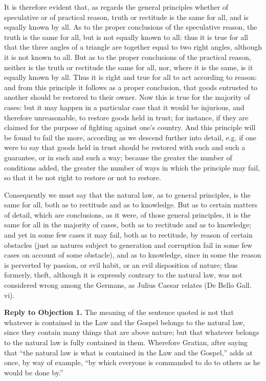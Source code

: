 It is therefore evident that, as regards the general principles whether of speculative or of practical reason, truth or rectitude is the same for all, and is equally known by all. As to the proper conclusions of the speculative reason, the truth is the same for all, but is not equally known to all: thus it is true for all that the three angles of a triangle are together equal to two right angles, although it is not known to all. But as to the proper conclusions of the practical reason, neither is the truth or rectitude the same for all, nor, where it is the same, is it equally known by all. Thus it is right and true for all to act according to reason: and from this principle it follows as a proper conclusion, that goods entrusted to another should be restored to their owner. Now this is true for the majority of cases: but it may happen in a particular case that it would be injurious, and therefore unreasonable, to restore goods held in trust; for instance, if they are claimed for the purpose of fighting against one's country. And this principle will be found to fail the more, according as we descend further into detail, e.g. if one were to say that goods held in trust should be restored with such and such a guarantee, or in such and such a way; because the greater the number of conditions added, the greater the number of ways in which the principle may fail, so that it be not right to restore or not to restore.

Consequently we must say that the natural law, as to general principles, is the same for all, both as to rectitude and as to knowledge. But as to certain matters of detail, which are conclusions, as it were, of those general principles, it is the same for all in the majority of cases, both as to rectitude and as to knowledge; and yet in some few cases it may fail, both as to rectitude, by reason of certain obstacles (just as natures subject to generation and corruption fail in some few cases on account of some obstacle), and as to knowledge, since in some the reason is perverted by passion, or evil habit, or an evil disposition of nature; thus formerly, theft, although it is expressly contrary to the natural law, was not considered wrong among the Germans, as Julius Caesar relates (De Bello Gall. vi).

\textbf{Reply to Objection 1.} The meaning of the sentence quoted is not that whatever is contained in the Law and the Gospel belongs to the natural law, since they contain many things that are above nature; but that whatever belongs to the natural law is fully contained in them. Wherefore Gratian, after saying that ``the natural law is what is contained in the Law and the Gospel,'' adds at once, by way of example, ``by which everyone is commanded to do to others as he would be done by.''

